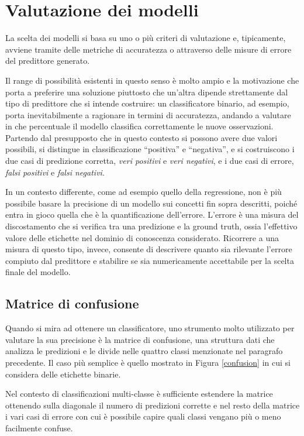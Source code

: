 \documentclass[12pt]{report}
\theoremstyle{definition}
\begin{document}
\section{Valutazione dei modelli}\label{evaluation}
La scelta dei modelli si basa su uno o più criteri di valutazione e, tipicamente, avviene tramite delle metriche di accuratezza o attraverso delle misure di errore del predittore generato.

Il range di possibilità esistenti in questo senso è molto ampio e la motivazione che porta a preferire una soluzione piuttosto che un'altra dipende strettamente dal tipo di predittore che si intende costruire: un classificatore binario, ad esempio, porta inevitabilmente a ragionare in termini di accuratezza, andando a valutare in che percentuale il modello classifica correttamente le nuove osservazioni.
Partendo dal presupposto che in questo contesto si possono avere due valori possibili, si distingue in classificazione ``positiva'' e ``negativa'', e si costruiscono i due casi di predizione corretta, \textit{veri positivi} e \textit{veri negativi}, e i due casi di errore, \textit{falsi positivi} e \textit{falsi negativi}.

In un contesto differente, come ad esempio quello della regressione, non è più possibile basare la precisione di un modello sui concetti fin sopra descritti, poiché entra in gioco quella che è la quantificazione dell'errore. L'errore è una misura del discostamento che si verifica tra una predizione e la ground truth, ossia l'effettivo valore delle etichette nel dominio di conoscenza considerato.
Ricorrere a una misura di questo tipo, invece, consente di descrivere quanto sia rilevante l'errore compiuto dal predittore e stabilire se sia numericamente accettabile per la scelta finale del modello.

\subsection{Matrice di confusione}
Quando si mira ad ottenere un classificatore, uno strumento molto utilizzato per valutare la sua precisione è la matrice di confusione, una struttura dati che analizza le predizioni e le divide nelle quattro classi menzionate nel paragrafo precedente. 
Il caso più semplice è quello mostrato in Figura \ref{confusion} in cui si considera delle etichette binarie.

Nel contesto di classificazioni multi-classe è sufficiente estendere la matrice ottenendo sulla diagonale il numero di predizioni corrette e nel resto della matrice i vari casi di errore con cui è possibile capire quali classi vengano più o meno facilmente confuse. 
\end{document}

